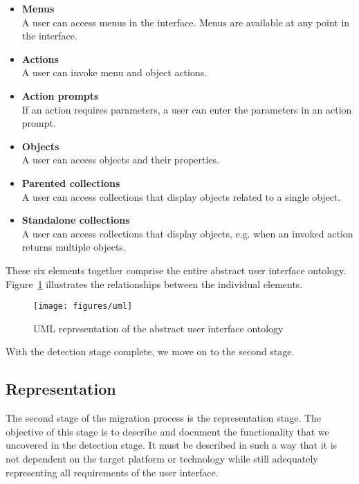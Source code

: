 \begin{itemize}
	\item 
	\textbf{Menus} \\
	A user can access menus in the interface. Menus are available at any point in the interface.
	
	\item
	\textbf{Actions} \\
	A user can invoke menu and object actions.
	
	\item
	\textbf{Action prompts} \\
	If an action requires parameters, a user can enter the parameters in an action prompt.
	
	\item
	\textbf{Objects} \\
	A user can access objects and their properties.
	
	\item
	\textbf{Parented collections} \\
	A user can access collections that display objects related to a single object.
	
	\item
	\textbf{Standalone collections} \\
	A user can access collections that display objects, e.g. when an invoked action returns multiple objects.
\end{itemize}

These six elements together comprise the entire abstract user interface ontology. Figure~\ref{figure:uml} illustrates the relationships between the individual elements.

\begin{figure}
	\center
	\texttt{[image: figures/uml]}
	\caption{UML representation of the abstract user interface ontology}
	\label{figure:uml}
\end{figure}

With the detection stage complete, we move on to the second stage.

\subsection{Representation}
\label{subsection:representation}
The second stage of the migration process is the representation stage. The objective of this stage is to describe and document the functionality that we uncovered in the detection stage. It must be described in such a way that it is not dependent on the target platform or technology while still adequately representing all requirements of the user interface.

